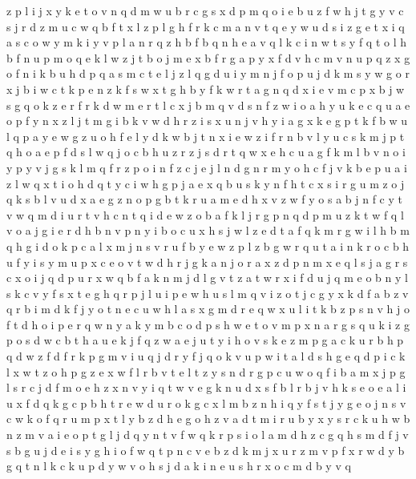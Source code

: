\documentclass{article}
\begin{document}
z p l i j x y k e t o v n q d m w u b r c g s
x d p m q o i e b u z f w h j t g y v c s
j r d z m u c w q b f t x l
z p l g h f r k c m a n v t q e y w u d s i
z g e t x i q a s c o w y m
k i y v p l a n r q z h b
f b q
n h e a v q
l k c i n w t
s y f q t o l h b
f n u p m o q e k l w z j t
b
o j m e x b f r g
a p y x f d v h c
m v n u p q z
x g o f n i k b u h d p q a s m c t e l j
z l q g d u i y m n j f o p
u j d k m s y w g o r
x j b i w c t k p e
n z k f s w x t g h
b y f k w r t a g n q d x i e v m c p
x b j w s g q o k z e r f
r k d w m e
r t l c x j b m q v d s n f z w i o a h y u k e
c q u a e o p f y n x z l j t m g i b k v w d h r
z i s x u n j v h y
i a g
x k e
g p t k f b w u l
q p a
y e w
g z u o h f e l y d k w b j t n x i
e w z i f r n b v l y u c s k m j p t q h o a
e p f d s l w q j o c b h u z r
z j s d r t q w x e h c u a g f k m l b v n o i y p
y v j g s k l m q f r z p o i n
f z c j
e j l n
d g n r m y o h c f j v k b e p u a i z l w q x t
i
o h d q t y c
i w h g p j a e x q b u s k
y n f h t c x s i r g u m z o
j q k s b l v u d x a e g z n o p
g b t k r u a m e d h x v z w f y o
s a b j n f c y t v w q m d i
u r t
v h c n t q i d e w z o b a f k l j r g p
n q d p
m u z k t w f q l v o a j g i e r d h b n
v p n y i b o c u x h s j w l z e d t a f q k m r g
w i l h b m
q h g i d o k p c a l x m j n s v r u f b y e w z
p l z b g w r q u t a
i n k r o c b h u f y
i s y m u p x c e o v t w d h r j g k a
n j o r a x
z d p n m x e q l s j a g r
s c x o i j q d
p u r x w q b f a k n m j d l g v t z
a t w r x i f d u j q m e o b n y l s k
c v y f s x t e g h q r p j l u i
p e w h u s l m q v i z o t j c g y x k d f a b
z v q r b i m d k f j y o t n e c u w h l a s x g
m d r e q w x u l i t k b z p s n v h j o
f t d h o i p e r q w n y a
k y m b c o d p s h w e
t o v m p x n a r g s q u k i
z g p o s d w c b t h a u e k j f
q z w
a e
j u t y i h o v s k e z m p g a
c k u r b h p q d w z f
d f r k p g m v i u q j
d r
y f j q o k v u p w i t a l d s
h g e q d p i c k l x w t z o
h p g z e x w f l r b v t
e l t z y s n d r g p c u w o q f i b a m x j
p g l s r c j d f m o e h z x n v y i q t w
v e g k n u d x s f b l r
b j v h k s e
o e a l i u x f d q k g c p b h t r
e w d u r o k g c x l m b z n h i q y f s t j
y g e o
j n s v c w k o f q r u m p x t l y b z d h e g
o h z v a d t m i r u
b y
x y s r c k u h w b n z m v a i e o p t g l j d q
y n t v f w q k r p s i o l a m d h z c
g q h s m d f j
v s b
g u j d e i
s y g h i o f w q t p n c v e b z d k m j x u r
z m v p f x r w d y b g q t n l k c
k u p d y w v o h s
j d
a k i n e u s h r x o c m d b y v q
\end{document}
